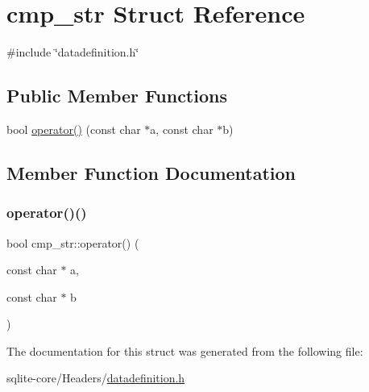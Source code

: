 \hypertarget{structcmp__str}{}\section{cmp\+\_\+str Struct Reference}
\label{structcmp__str}


{\ttfamily \#include \char`\"{}datadefinition.\+h\char`\"{}}

\subsection*{Public Member Functions}
\begin{DoxyCompactItemize}
\item 
bool \mbox{\hyperlink{structcmp__str_a2372a37bf9dcd1b9bcd95583e20cc058}{operator()}} (const char $\ast$a, const char $\ast$b)
\end{DoxyCompactItemize}


\subsection{Member Function Documentation}
\mbox{\label{structcmp__str_a2372a37bf9dcd1b9bcd95583e20cc058}} 
\subsubsection{\texorpdfstring{operator()()}{operator()()}}
{\footnotesize\ttfamily bool cmp\+\_\+str\+::operator() (\begin{DoxyParamCaption}\item[{const char $\ast$}]{a,  }\item[{const char $\ast$}]{b }\end{DoxyParamCaption})\hspace{0.3cm}{\ttfamily [inline]}}



The documentation for this struct was generated from the following file\+:\begin{DoxyCompactItemize}
\item 
sqlite-\/core/\+Headers/\mbox{\hyperlink{datadefinition_8h}{datadefinition.\+h}}\end{DoxyCompactItemize}
